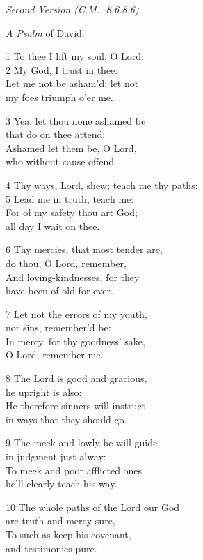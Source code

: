 \begin{center}
\quad{}\quad{}
\end{center}

\emph{Second Version (C.M., 8.6.8.6)}

\emph{A Psalm} of David.

1 To thee I lift my soul, O Lord:\\
2 My God, I trust in thee:\\
Let me not be asham’d; let not\\
my foes triumph o’er me.

3 Yea, let thou none ashamed be\\
that do on thee attend:\\
Ashamed let them be, O Lord,\\
who without cause offend.

4 Thy ways, Lord, shew; teach me thy paths:\\
5 Lead me in truth, teach me:\\
For of my safety thou art God;\\
all day I wait on thee.

6 Thy mercies, that most tender are,\\
do thou, O Lord, remember,\\
And loving-kindnesses; for they\\
have been of old for ever.

7 Let not the errors of my youth,\\
nor sins, remember’d be:\\
In mercy, for thy goodness’ sake,\\
O Lord, remember me.

8 The Lord is good and gracious,\\
he upright is also:\\
He therefore sinners will instruct\\
in ways that they should go.

9 The meek and lowly he will guide\\
in judgment just alway:\\
To meek and poor afflicted ones\\
he’ll clearly teach his way.

10 The whole paths of the Lord our God\\
are truth and mercy sure,\\
To such as keep his covenant,\\
and testimonies pure.

